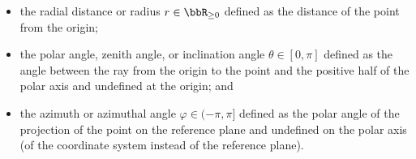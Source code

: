 \documentclass[a4paper,12pt]{report}
\begin{document}
\begin{itemize}
\begin{itemize}
\subsubsection{Line element}
\[\dd{\mb{r}}=\dd{r}\hat{\mb{e}}_r+r\dd{\theta}\hat{\mb{e}}_{\theta}+\dd{z}\hat{\mb{e}}_z\]
\subsubsection{Volume element}
\[\dd{V}=r\dd{r}\dd{\theta}\dd{z}\]
\bpr
\[T\colon(r,\theta,z)\mapsto(x,y,z)=(r\cos\theta,r\sin\theta,z).\]
\[J_T=\begin{pmatrix}
\cos\theta & -r\sin\theta & 0\\
\sin\theta & r \cos\theta & 0\\
0 & 0 & 1
\end{pmatrix}\]
\[\abs{\det(J_T)}=r\]
\epr
\subsubsection{Surface element}
$r=$ constant:
\[\dd{\mb{S}}=\hat{\mb{e}}_rr\dd{\theta}\dd{z}\]
$\theta=$ constant:
\[\dd{\mb{S}}=\hat{\mb{e}}_{\theta}\dd{r}\dd{z}\]
$z=$ constant:
\[\dd{\mb{S}}=\hat{\mb{e}}_zr\dd{r}\dd{\theta}\]
\subsection{Spherical coordinate system (球座標系)}
\subsubsection{Physics convention, ISO 80000-2, or inclination-azimuth convention definition}
A spherical coordinate system is a three-dimensional coordinate system that specifies point positions by a polar axis (a chosen directed line) and an auxiliary axis (a reference ray) with the intersection of the two axes called the origin and the plane passing through the origin and perpendicular to the polar axis equipped with polar coordinate system with the polar axis being the auxiliary axis called the reference plane. The three spherical coordinates $(r,\theta,\varphi)$ are:
\bit
\item the radial distance or radius $r\in\bbR_{\geq 0}$ defined as the distance of the point from the origin;
\item the polar angle, zenith angle, or inclination angle $\theta\in[0,\pi]$ defined as the angle between the ray from the origin to the point and the positive half of the polar axis and undefined at the origin; and
\item the azimuth or azimuthal angle $\varphi\in(-\pi,\pi]$ defined as the polar angle of the projection of the point on the reference plane and undefined on the polar axis (of the coordinate system instead of the reference plane).
\eit

\end{itemize}
\end{itemize}
\end{document}
